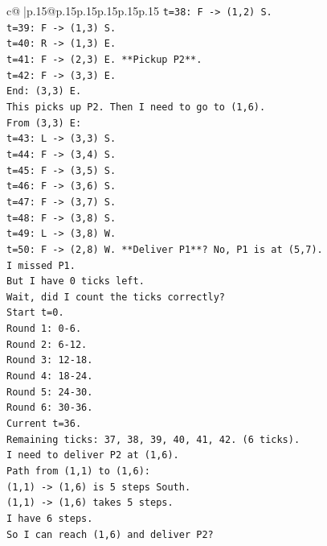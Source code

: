 \documentclass{article}
\begin{document}
{\begin{supertabular}{c@{$\;$}|p{.15\linewidth}@{}p{.15\linewidth}p{.15\linewidth}p{.15\linewidth}p{.15\linewidth}p{.15\linewidth}}
{{{\texttt{t=38: F {-}> (1,2) S.} \\
\texttt{t=39: F {-}> (1,3) S.} \\
\texttt{t=40: R {-}> (1,3) E.} \\
\texttt{t=41: F {-}> (2,3) E. **Pickup P2**.} \\
\texttt{t=42: F {-}> (3,3) E.} \\
\texttt{End: (3,3) E.} \\
\texttt{This picks up P2. Then I need to go to (1,6).} \\
\texttt{From (3,3) E:} \\
\texttt{t=43: L {-}> (3,3) S.} \\
\texttt{t=44: F {-}> (3,4) S.} \\
\texttt{t=45: F {-}> (3,5) S.} \\
\texttt{t=46: F {-}> (3,6) S.} \\
\texttt{t=47: F {-}> (3,7) S.} \\
\texttt{t=48: F {-}> (3,8) S.} \\
\texttt{t=49: L {-}> (3,8) W.} \\
\texttt{t=50: F {-}> (2,8) W. **Deliver P1**? No, P1 is at (5,7).} \\
\texttt{I missed P1.} \\
\texttt{But I have 0 ticks left.} \\
\texttt{Wait, did I count the ticks correctly?} \\
\texttt{Start t=0.} \\
\texttt{Round 1: 0{-}6.} \\
\texttt{Round 2: 6{-}12.} \\
\texttt{Round 3: 12{-}18.} \\
\texttt{Round 4: 18{-}24.} \\
\texttt{Round 5: 24{-}30.} \\
\texttt{Round 6: 30{-}36.} \\
\texttt{Current t=36.} \\
\texttt{Remaining ticks: 37, 38, 39, 40, 41, 42. (6 ticks).} \\
\texttt{I need to deliver P2 at (1,6).} \\
\texttt{Path from (1,1) to (1,6):} \\
\texttt{(1,1) {-}> (1,6) is 5 steps South.} \\
\texttt{(1,1) {-}> (1,6) takes 5 steps.} \\
\texttt{I have 6 steps.} \\
\texttt{So I can reach (1,6) and deliver P2?} \\
}}}
\end{supertabular}}
\end{document}
